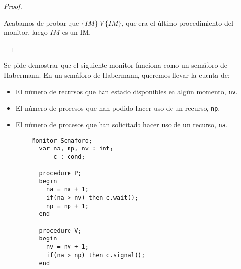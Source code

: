 \begin{ejemplo}
\begin{proof}
\begin{enumerate}
                Acabamos de probar que $\{IM\}\ V\ \{IM\}$, que era el último procedimiento del monitor, luego $IM$ es un IM\@.
        \end{enumerate}
    \end{proof}
\end{ejemplo}

\begin{ejercicio*}
    Se pide demostrar que el siguiente monitor funciona como un semáforo de Habermann.
    En un semáforo de Habermann, queremos llevar la cuenta de:
    \begin{itemize}
        \item El número de recursos que han estado disponibles en algún momento, \verb|nv|.
        \item El número de procesos que han podido hacer uso de un recurso, \verb|np|.
        \item El número de procesos que han solicitado hacer uso de un recurso, \verb|na|.
    \end{itemize}
    \begin{verbatim}
        Monitor Semaforo;
          var na, np, nv : int;
              c : cond;

          procedure P;
          begin
            na = na + 1;
            if(na > nv) then c.wait();
            np = np + 1;
          end

          procedure V;
          begin
            nv = nv + 1;
            if(na > np) then c.signal();
          end


\end{verbatim}
\end{ejercicio*}
